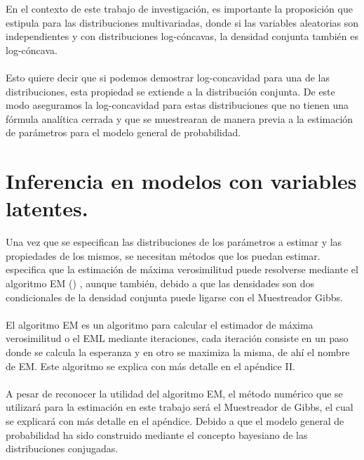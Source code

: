 En el contexto de este trabajo de investigaci\'on, es importante la proposici\'on que estipula \cite{an1996log} para las distribuciones multivariadas, donde si las variables aleatorias son independientes y con distribuciones log-c\'oncavas, la densidad conjunta tambi\'en es log-c\'oncava.\\
\\
Esto quiere decir que si podemos demostrar log-concavidad para una de las distribuciones, esta propiedad se extiende a la distribuci\'on conjunta. De este modo aseguramos la log-concavidad para estas distribuciones que no tienen una f\'ormula anal\'itica cerrada y que se muestrearan de manera previa a la estimaci\'on de par\'ametros para el modelo general de probabilidad.
\section{Inferencia en modelos con variables latentes.}
Una vez que se especifican las distribuciones de los par\'ametros a estimar y las propiedades de los mismos, se necesitan m\'etodos que los puedan estimar. \cite{pitt2002constructing} especifica que la estimaci\'on de m\'axima verosimilitud puede resolverse mediante el algoritmo EM (\cite{dempster1977maximum}) , aunque tambi\'en, debido a que las densidades son dos condicionales de la densidad conjunta puede ligarse con el Muestreador Gibbs.\\
\\
El algoritmo EM es un algoritmo para calcular el estimador de m\'axima verosimilitud o el EML mediante iteraciones, cada iteraci\'on consiste en un paso donde se calcula la esperanza y en otro se maximiza la misma, de ah\'i el nombre de EM. Este algoritmo se explica con m\'as detalle en el ap\'endice II.\\
\\
A pesar de reconocer la utilidad del algoritmo EM, el m\'etodo num\'erico que se utilizar\'a para la estimaci\'on en este trabajo ser\'a el Muestreador de Gibbs, el cual se explicar\'a con m\'as detalle en el ap\'endice. Debido a que el modelo general de probabilidad ha sido construido mediante el concepto bayesiano de las distribuciones conjugadas. 